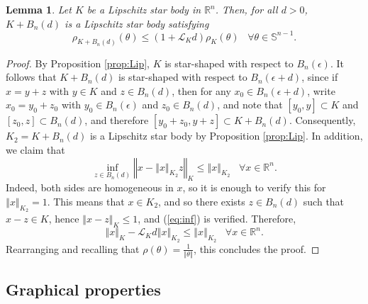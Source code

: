 \documentclass[11pt]{article}
\newtheorem{lem}[thm]{Lemma}
\theoremstyle{definition}
\theoremstyle{proof}
\DeclareMathOperator{\+}{\mathop{\tilde{+}}}
\newcommand{\Lip}{\mathcal{L}}
\newcommand{\norm}[1]{\left\Vert#1\right\Vert}
\newcommand{\R}{\mathbb{R}}
\renewcommand{\S}{\mathbb{S}}
\newcommand{\eps}{\epsilon}
\numberwithin{equation}{section}
\numberwithin{equation}{section}
\begin{document}
\begin{lem} \label{lem:adding-ball}
Let $K$ be a Lipschitz star body in $\R^n$. Then, for all $d > 0$, $K + B_n(d)$ is a Lipschitz star body satisfying
\[
\rho_{K + B_n(d)}(\theta) \leq (1 + \Lip_K d) \rho_K(\theta) \;\;\; \forall \theta \in \S^{n-1} . 
\]
\end{lem}
\begin{proof}
By Proposition \ref{prop:Lip}, $K$ is star-shaped with respect to $B_n(\eps)$. It follows that $K + B_n(d)$ is star-shaped with respect to $B_n(\eps + d)$, since if $x = y + z$ with $y \in K$ and $z \in B_n(d)$, then for any $x_0 \in B_n(\eps + d)$, write $x_0 = y_0 + z_0$ with $y_0 \in B_n(\eps)$ and $z_0 \in B_n(d)$, and note that $[y_0,y] \subset K$ and $[z_0,z] \subset B_n(d)$, and therefore $[y_0+z_0 , y+z] \subset K + B_n(d)$. Consequently, $K_2 = K + B_n(d)$ is a Lipschitz star body by Proposition \ref{prop:Lip}. In addition, we claim that
\begin{equation} \label{eq:inf}
\inf_{z \in B_n(d)} \norm{x - \norm{x}_{K_2} z}_K \leq \norm{x}_{K_2} \;\;\; \forall x \in \R^n . 
\end{equation}
Indeed, both sides are homogeneous in $x$, so it is enough to verify this for $\norm{x}_{K_2} = 1$. This means that $x \in K_2$, and so there exists $z \in B_n(d)$ such that $x - z \in K$, hence $\norm{x-z}_K \leq 1$, and (\ref{eq:inf}) is verified. Therefore,
\[
\norm{x}_K - \Lip_K d \norm{x}_{K_2} \leq \norm{x}_{K_2} \;\;\; \forall x \in \R^n . 
\]
Rearranging and recalling that $\rho(\theta) = \frac{1}{\norm{\theta}}$, this concludes the proof. 
\end{proof}

\subsection{Graphical properties}
\end{document}
